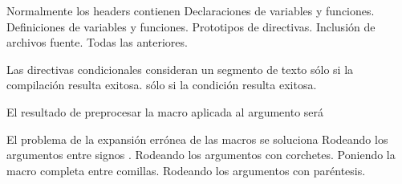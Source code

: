 \begin{preguntas}
\question Normalmente los headers contienen
\correctchoice Declaraciones de variables y funciones.
\choice Definiciones de variables y funciones.
\choice Prototipos de directivas.
\choice Inclusión de archivos fuente.
\choice Todas las anteriores.

\question Las directivas condicionales consideran un segmento de texto
\choice sólo si la compilación resulta exitosa.
\correctchoice sólo si la condición resulta exitosa.

\question El resultado de preprocesar la macro  aplicada al argumento  será 
\choice {}
\correctchoice {}
\choice {}
\choice {}

\question El problema de la expansión errónea de las macros se soluciona 
\choice Rodeando los argumentos entre signos \code{\<\>}.
\choice Rodeando los argumentos con corchetes.
\choice Poniendo la macro completa entre comillas.
\correctchoice Rodeando los argumentos con paréntesis.
\end{preguntas}
